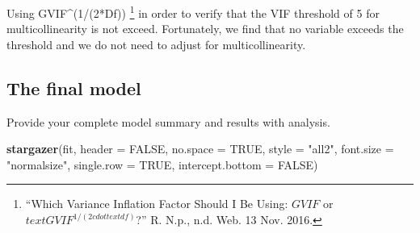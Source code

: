 \documentclass[]{article}
\newenvironment{Shaded}{\begin{snugshade}}{\end{snugshade}}
\newcommand{\KeywordTok}[1]{\textcolor[rgb]{0.13,0.29,0.53}{\textbf{{#1}}}}
\newcommand{\DataTypeTok}[1]{\textcolor[rgb]{0.13,0.29,0.53}{{#1}}}
\newcommand{\StringTok}[1]{\textcolor[rgb]{0.31,0.60,0.02}{{#1}}}
\newcommand{\OtherTok}[1]{\textcolor[rgb]{0.56,0.35,0.01}{{#1}}}
\newcommand{\NormalTok}[1]{{#1}}
\let\rmarkdownfootnote\footnote%
\def\footnote{\protect\rmarkdownfootnote}
\begin{document}
Using GVIF\^{}(1/(2*Df)) \footnote{``Which Variance Inflation Factor
  Should I Be Using: \(GVIF\) or \(text{GVIF}^{1/(2cdottext{df})}\)?''
  R. N.p., n.d. Web. 13 Nov. 2016.} in order to verify that the VIF
threshold of 5 for multicollinearity is not exceed. Fortunately, we find
that no variable exceeds the threshold and we do not need to adjust for
multicollinearity.

\subsection{The final model}\label{the-final-model}

Provide your complete model summary and results with analysis.

\begin{Shaded}
\begin{Highlighting}[]
\KeywordTok{stargazer}\NormalTok{(fit, }\DataTypeTok{header =} \OtherTok{FALSE}\NormalTok{, }\DataTypeTok{no.space =} \OtherTok{TRUE}\NormalTok{, }
          \DataTypeTok{style =} \StringTok{"all2"}\NormalTok{, }\DataTypeTok{font.size =} \StringTok{"normalsize"}\NormalTok{, }
          \DataTypeTok{single.row =} \OtherTok{TRUE}\NormalTok{, }\DataTypeTok{intercept.bottom =} \OtherTok{FALSE}\NormalTok{)}
\end{Highlighting}
\end{Shaded}
\end{document}
